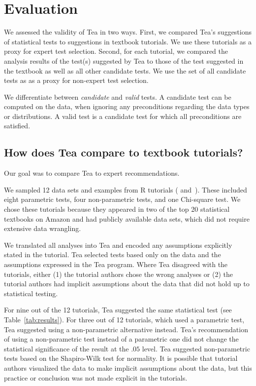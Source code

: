 
\section{Evaluation} \label{sec:evalTea}
We assessed the validity of Tea in two ways. First, we compared Tea's
suggestions of statistical tests to suggestions in textbook tutorials.
We use these tutorials as a proxy for expert test selection.
Second, for each tutorial, we compared the analysis results of the test(s)
suggested by Tea to those of the test suggested in the textbook as well as all
other candidate tests. We use the set of all candidate tests as as a proxy for
non-expert test selection.

We differentiate between \textit{candidate} and \textit{valid} tests. A candidate test can be
computed on the data, when ignoring any preconditions regarding the data types or
distributions. A valid test is a candidate test for which all preconditions are
satisfied.

\subsection{How does Tea compare to textbook tutorials?}
Our goal was to compare Tea to expert recommendations.

We sampled 12 data sets and examples from R tutorials (\cite{kabacoff2011action}
and~\cite{field2012discoveringR}). These included eight parametric tests, four
non-parametric tests, and one Chi-square test. We chose these tutorials because they
appeared in two of the top 20 statistical textbooks on Amazon and had publicly available
data sets, which did not require extensive data wrangling.

We translated all analyses into Tea and encoded any assumptions explicitly
stated in the tutorial. Tea selected tests based only on the data and the
assumptions expressed in the Tea program. Where Tea disagreed with the
tutorials, either (1) the tutorial authors chose the wrong analyses or (2) the tutorial authors
had implicit assumptions about the data that did not hold up to statistical testing. 

For nine out of the 12 tutorials, Tea suggested the same statistical test (see
Table~\ref{tab:results}). For three out of 12 tutorials, which used a parametric
test, Tea suggested using a non-parametric alternative instead. Tea's
recommendation of using a non-parametric test instead of a parametric one did
not change the statistical significance of the result at the $.05$ level. Tea
suggested non-parametric tests based on the Shapiro-Wilk test for normality. It
is possible that tutorial authors visualized the data to make implicit
assumptions about the data, but this practice or conclusion was not made
explicit in the tutorials.

